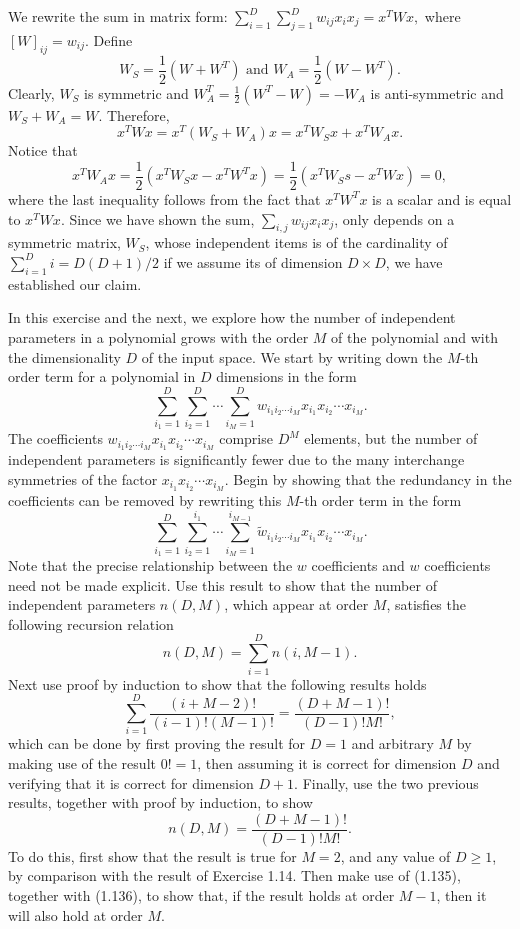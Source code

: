 We rewrite the sum in matrix form: $\sum_{i=1}^{D}\sum_{j=1}^{D}w_{ij}x_{i}x_{j}=x^{T}Wx,$
where $[W]_{ij}=w_{ij}.$ Define 
\[
W_{S}=\frac{1}{2}(W+W^{T})\text{ and }W_{A}=\frac{1}{2}(W-W^{T}).
\]
Clearly, $W_{S}$ is symmetric and $W_{A}^{T}=\frac{1}{2}(W^{T}-W)=-W_{A}$
is anti-symmetric and $W_{S}+W_{A}=W.$ Therefore, 
\[
x^{T}Wx=x^{T}(W_{S}+W_{A})x=x^{T}W_{S}x+x^{T}W_{A}x.
\]
Notice that 
\[
x^{T}W_{A}x=\frac{1}{2}(x^{T}W_{S}x-x^{T}W^{T}x)=\frac{1}{2}(x^{T}W_{S}s-x^{T}Wx)=0,
\]
where the last inequality follows from the fact that $x^{T}W^{T}x$
is a scalar and is equal to $x^{T}Wx.$ Since we have shown the sum,
$\sum_{i,j}w_{ij}x_{i}x_{j}$, only depends on a symmetric matrix,
$W_{S}$, whose independent items is of the cardinality of $\sum_{i=1}^{D}i=D(D+1)/2$
if we assume its of dimension $D\times D$, we have established our
claim. \\
\begin{cBoxA}{}
 In this exercise and the next, we explore how the number of independent
parameters in a polynomial grows with the order $M$ of the polynomial
and with the dimensionality $D$ of the input space. We start by writing
down the $M$-th order term for a polynomial in $D$ dimensions in
the form
\[
\sum_{i_{1}=1}^{D}\sum_{i_{2}=1}^{D}\cdots\sum_{i_{M}=1}^{D}w_{i_{1}i_{2}\cdots i_{M}}x_{i_{1}}x_{i_{2}}\cdots x_{i_{M}}.
\]
The coefficients $w_{i_{1}i_{2}\cdots i_{M}}x_{i_{1}}x_{i_{2}}\cdots x_{i_{M}}$
comprise $D^{M}$ elements, but the number of independent parameters
is significantly fewer due to the many interchange symmetries of the
factor $x_{i_{1}}x_{i_{2}}\cdots x_{i_{M}}$. Begin by showing that
the redundancy in the coefficients can be removed by rewriting this
$M$-th order term in the form
\[
\sum_{i_{1}=1}^{D}\sum_{i_{2}=1}^{i_{1}}\cdots\sum_{i_{M}=1}^{i_{M-1}}\tilde{w}_{i_{1}i_{2}\cdots i_{M}}x_{i_{1}}x_{i_{2}}\cdots x_{i_{M}}.
\]
Note that the precise relationship between the $w$ coefficients and
$w$ coefficients need not be made explicit. Use this result to show
that the number of independent parameters $n(D,M)$, which appear
at order $M$, satisfies the following recursion relation 
\[
n(D,M)=\sum_{i=1}^{D}n(i,M-1).
\]
Next use proof by induction to show that the following results holds
\[
\sum_{i=1}^{D}\frac{(i+M-2)!}{(i-1)!(M-1)!}=\frac{(D+M-1)!}{(D-1)!M!},
\]
which can be done by first proving the result for $D=1$ and arbitrary
$M$ by making use of the result $0!=1$, then assuming it is correct
for dimension $D$ and verifying that it is correct for dimension
$D+1$. Finally, use the two previous results, together with proof
by induction, to show
\[
n(D,M)=\frac{(D+M-1)!}{(D-1)!M!}.
\]
To do this, first show that the result is true for $M=2$, and any
value of $D\geq1$, by comparison with the result of Exercise 1.14.
Then make use of (1.135), together with (1.136), to show that, if
the result holds at order $M-1$, then it will also hold at order
$M$. 
\end{cBoxA}


